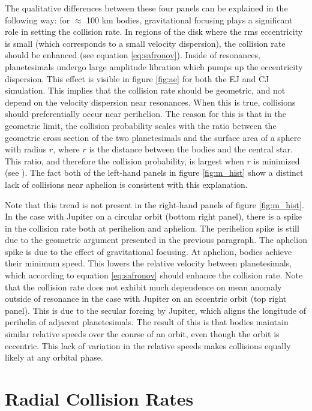 \documentclass[twocolumn]{aastex63}
\begin{document}
The qualitative differences between these four panels can be explained in the following way: for $\approx$ 100 km bodies, 
gravitational focusing plays a significant role in setting the collision rate. In regions of the disk where the rms eccentricity is small 
(which corresponds to a small velocity dispersion), the collision rate should be enhanced (see equation \ref{eq:safronov}). Inside of 
resonances, planetesimals undergo large amplitude libration which pumps up the eccentricity dispersion. This effect is visible in 
figure \ref{fig:ae} for both the EJ and CJ simulation. This implies that the collision rate should be geometric, and not depend on the 
velocity dispersion near resonances. When this is true, collisions should preferentially occur near perihelion. The reason for this is 
that in the geometric limit, the collision probability scales with the ratio between the geometric cross section of the two planetesimals 
and the surface area of a sphere with radius $r$, where $r$ is the distance between the bodies and the central star. This ratio, and 
therefore the collision probability, is largest when $r$ is minimized (see \citet{2003AJ....125.2692L}). The fact both of the left-hand 
panels in figure \ref{fig:m_hist} show a distinct lack of collisions near aphelion is consistent with this explanation.

Note that this trend is not present in the right-hand panels of figure \ref{fig:m_hist}. In the case with Jupiter on a circular orbit (bottom right panel), there is a spike in the collision rate both at perihelion and aphelion. The perihelion spike is still due to the geometric argument presented in the previous paragraph. The aphelion spike is due to the effect of gravitational focusing. At aphelion, bodies achieve their minimum speed. This lowers the relative velocity between planetesimals, which according to equation \ref{eq:safronov} should enhance the collision rate. Note that the collision rate does not exhibit much dependence on mean anomaly outside of resonance in the case with Jupiter on an eccentric orbit (top right panel). This is due to the secular forcing by Jupiter, which aligns the longitude of perihelia of adjacent planetesimals. The result of this is that bodies maintain similar relative speeds over the course of an orbit, even though the orbit is eccentric. This lack of variation in the relative speeds makes collisions equally likely at any orbital phase.

\section{Radial Collision Rates}\label{sec:rad_coll}
\end{document}
